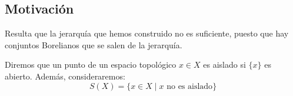 
\subsection{Motivación}
\noindent
Resulta que la jerarquía que hemos construido no es suficiente, puesto que hay conjuntos Borelianos que se salen de la jerarquía.

\begin{definicion}
    Diremos que un punto de un espacio topológico $x\in X$ es aislado si $\{x\}$ es abierto.\newline
    Además, consideraremos:
    \begin{equation*}
        S(X) = \{x\in X \mid x \text{\ no es aislado}\}
    \end{equation*}
\end{definicion}

